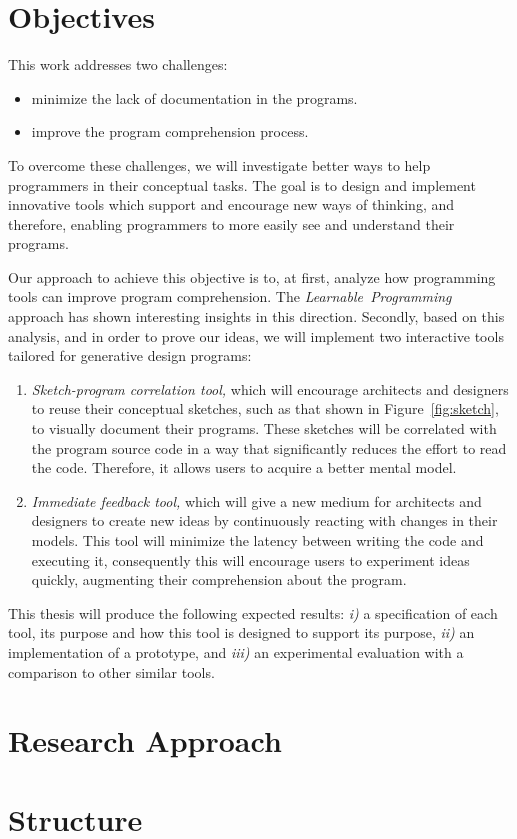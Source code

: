 \section{Objectives}

This work addresses two challenges:

\begin{itemize}
\item minimize the lack of documentation in the programs.
\item improve the program comprehension process.
\end{itemize}

To overcome these challenges, we will investigate better ways to help programmers in their conceptual tasks. The goal is to design and implement innovative tools which support and encourage new ways of thinking, and therefore, enabling programmers to more easily see and understand their programs.

Our approach to achieve this objective is to, at first, analyze how programming tools can improve program comprehension. The \textit{Learnable~Programming}~\citep{learnableProg,inventingPrin} approach has shown interesting insights in this direction. Secondly, based on this analysis, and in order to prove our ideas, we will implement two interactive tools tailored for generative design programs: 

\begin{enumerate}
\item \textit{Sketch-program correlation tool,} which will encourage architects and designers to reuse their conceptual sketches, such as that shown in Figure~\ref{fig:sketch}, to visually document their programs. These sketches will be correlated with the program source code in a way that significantly reduces the effort to read the code. Therefore, it allows users to acquire a better mental model.

\item \textit{Immediate feedback tool,} which will give a new medium for architects and designers to create new ideas by continuously reacting with changes in their models. This tool will minimize the latency between writing the code and executing it, consequently this will encourage users to experiment ideas quickly, augmenting their comprehension about the program.
\end{enumerate}

This thesis will produce the following expected results: \textit{i)} a specification of each tool, its purpose and how this tool is designed to support its purpose, \textit{ii)} an implementation of a prototype, and \textit{iii)} an experimental evaluation with a comparison to other similar tools.

\section{Research Approach}

\section{Structure}
